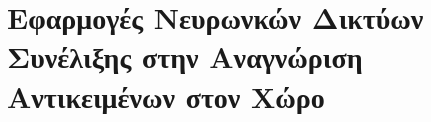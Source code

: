 \section{Εφαρμογές Νευρωνκών Δικτύων Συνέλιξης στην Αναγνώριση Αντικειμένων στον Χώρο}
\label{sec:theory_object_recognition}

